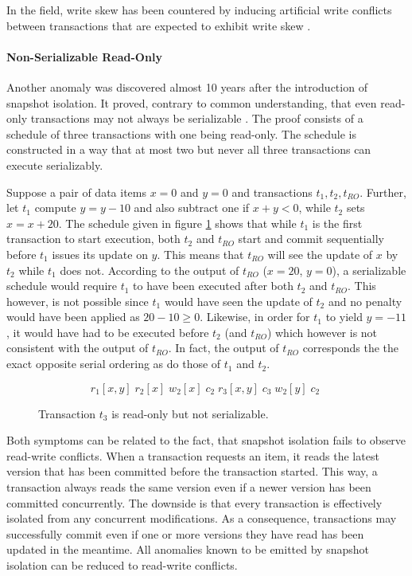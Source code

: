 In the field, write skew has been countered by inducing artificial write
conflicts between transactions that are expected to exhibit write skew
\cite{fekete2005making}.

\paragraph{Non-Serializable Read-Only}

Another anomaly was discovered almost 10 years after the introduction of
snapshot isolation. It proved, contrary to common understanding, that even
read-only transactions may not always be serializable \cite{fekete2004read}. The
proof consists of a schedule of three transactions with one being read-only. The
schedule is constructed in a way that at most two but never all three
transactions can execute serializably.

Suppose a pair of data items $x = 0$ and $y = 0$ and transactions $t_1, t_2,
t_{RO}$. Further, let $t_1$ compute $y = y - 10$ and also subtract one if $x + y <
0$, while $t_2$ sets $x = x + 20$. The schedule given in figure
\ref{fig:bad_read_only} shows that while $t_1$ is the first transaction to start
execution, both $t_2$ and $t_{RO}$ start and commit sequentially before $t_1$
issues its update on $y$. This means that $t_{RO}$ will see the update of $x$ by
$t_2$ while $t_1$ does not. According to the output of $t_{RO}$ ($x = 20$, $y =
0$), a serializable schedule would require $t_1$ to have been executed after
both $t_2$ and $t_{RO}$. This however, is not possible since $t_1$ would have
seen the update of $t_2$ and no penalty would have been applied as $20 - 10 \geq
0$. Likewise, in order for $t_1$ to yield $y = -11$, it would have had to be
executed before $t_2$ (and $t_{RO}$) which however is not consistent with the
output of $t_{RO}$. In fact, the output of $t_{RO}$ corresponds the the exact
opposite serial ordering as do those of $t_1$ and $t_2$.

\begin{figure}[h!]
    \centering
    \[
        r_1[x,y]\; r_2[x]\; w_2[x]\; c_2\; r_3[x,y]\; c_3\; w_2[y]\; c_2\;
    \]
    \caption{Transaction $t_3$ is read-only but not serializable.}
    \label{fig:bad_read_only}
\end{figure}

Both symptoms can be related to the fact, that snapshot isolation fails to
observe read-write conflicts. When a transaction requests an item, it reads the
latest version that has been committed before the transaction started. This way,
a transaction always reads the same version even if a newer version has been
committed concurrently. The downside is that every transaction is effectively
isolated from any concurrent modifications. As a consequence, transactions may
successfully commit even if one or more versions they have read has been updated
in the meantime. All anomalies known to be emitted by snapshot isolation can be
reduced to read-write conflicts.

